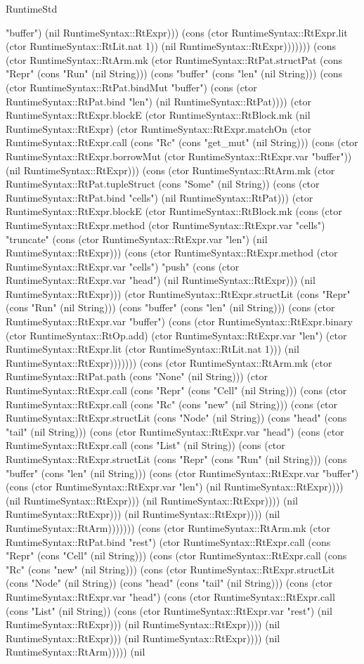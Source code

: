\begin{lexlean}{RuntimeStd}
\begin{semanticmodule}
{"buffer") (nil RuntimeSyntax::RtExpr))) (cons (ctor RuntimeSyntax::RtExpr.lit (ctor RuntimeSyntax::RtLit.nat 1)) (nil RuntimeSyntax::RtExpr))))))) (cons (ctor RuntimeSyntax::RtArm.mk (ctor RuntimeSyntax::RtPat.structPat (cons "Repr" (cons "Run" (nil String))) (cons "buffer" (cons "len" (nil String))) (cons (ctor RuntimeSyntax::RtPat.bindMut "buffer") (cons (ctor RuntimeSyntax::RtPat.bind "len") (nil RuntimeSyntax::RtPat)))) (ctor RuntimeSyntax::RtExpr.blockE (ctor RuntimeSyntax::RtBlock.mk (nil RuntimeSyntax::RtExpr) (ctor RuntimeSyntax::RtExpr.matchOn (ctor RuntimeSyntax::RtExpr.call (cons "Rc" (cons "get_mut" (nil String))) (cons (ctor RuntimeSyntax::RtExpr.borrowMut (ctor RuntimeSyntax::RtExpr.var "buffer")) (nil RuntimeSyntax::RtExpr))) (cons (ctor RuntimeSyntax::RtArm.mk (ctor RuntimeSyntax::RtPat.tupleStruct (cons "Some" (nil String)) (cons (ctor RuntimeSyntax::RtPat.bind "cells") (nil RuntimeSyntax::RtPat))) (ctor RuntimeSyntax::RtExpr.blockE (ctor RuntimeSyntax::RtBlock.mk (cons (ctor RuntimeSyntax::RtExpr.method (ctor RuntimeSyntax::RtExpr.var "cells") "truncate" (cons (ctor RuntimeSyntax::RtExpr.var "len") (nil RuntimeSyntax::RtExpr))) (cons (ctor RuntimeSyntax::RtExpr.method (ctor RuntimeSyntax::RtExpr.var "cells") "push" (cons (ctor RuntimeSyntax::RtExpr.var "head") (nil RuntimeSyntax::RtExpr))) (nil RuntimeSyntax::RtExpr))) (ctor RuntimeSyntax::RtExpr.structLit (cons "Repr" (cons "Run" (nil String))) (cons "buffer" (cons "len" (nil String))) (cons (ctor RuntimeSyntax::RtExpr.var "buffer") (cons (ctor RuntimeSyntax::RtExpr.binary (ctor RuntimeSyntax::RtOp.add) (ctor RuntimeSyntax::RtExpr.var "len") (ctor RuntimeSyntax::RtExpr.lit (ctor RuntimeSyntax::RtLit.nat 1))) (nil RuntimeSyntax::RtExpr))))))) (cons (ctor RuntimeSyntax::RtArm.mk (ctor RuntimeSyntax::RtPat.path (cons "None" (nil String))) (ctor RuntimeSyntax::RtExpr.call (cons "Repr" (cons "Cell" (nil String))) (cons (ctor RuntimeSyntax::RtExpr.call (cons "Rc" (cons "new" (nil String))) (cons (ctor RuntimeSyntax::RtExpr.structLit (cons "Node" (nil String)) (cons "head" (cons "tail" (nil String))) (cons (ctor RuntimeSyntax::RtExpr.var "head") (cons (ctor RuntimeSyntax::RtExpr.call (cons "List" (nil String)) (cons (ctor RuntimeSyntax::RtExpr.structLit (cons "Repr" (cons "Run" (nil String))) (cons "buffer" (cons "len" (nil String))) (cons (ctor RuntimeSyntax::RtExpr.var "buffer") (cons (ctor RuntimeSyntax::RtExpr.var "len") (nil RuntimeSyntax::RtExpr)))) (nil RuntimeSyntax::RtExpr))) (nil RuntimeSyntax::RtExpr)))) (nil RuntimeSyntax::RtExpr))) (nil RuntimeSyntax::RtExpr)))) (nil RuntimeSyntax::RtArm))))))) (cons (ctor RuntimeSyntax::RtArm.mk (ctor RuntimeSyntax::RtPat.bind "rest") (ctor RuntimeSyntax::RtExpr.call (cons "Repr" (cons "Cell" (nil String))) (cons (ctor RuntimeSyntax::RtExpr.call (cons "Rc" (cons "new" (nil String))) (cons (ctor RuntimeSyntax::RtExpr.structLit (cons "Node" (nil String)) (cons "head" (cons "tail" (nil String))) (cons (ctor RuntimeSyntax::RtExpr.var "head") (cons (ctor RuntimeSyntax::RtExpr.call (cons "List" (nil String)) (cons (ctor RuntimeSyntax::RtExpr.var "rest") (nil RuntimeSyntax::RtExpr))) (nil RuntimeSyntax::RtExpr)))) (nil RuntimeSyntax::RtExpr))) (nil RuntimeSyntax::RtExpr)))) (nil RuntimeSyntax::RtArm))))) (nil }
\end{semanticmodule}
\end{lexlean}
